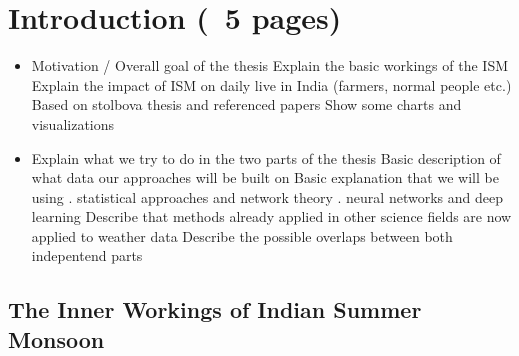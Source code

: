 \chapter{Introduction (~5 pages)}
\begin{itemize}
	\item Motivation / Overall goal of the thesis
	\subitem Explain the basic workings of the ISM
	\subitem Explain the impact of ISM on daily live in India (farmers, normal people etc.)
	\subitem Based on stolbova thesis and referenced papers
	\subitem Show some charts and visualizations
	\item Explain what we try to do in the two parts of the thesis
	\subitem Basic description of what data our approaches will be built on
	\subitem Basic explanation that we will be using
	. statistical approaches and network theory
	. neural networks and deep learning
	\subitem Describe that methods already applied in other science fields are now applied to weather data
	\subitem Describe the possible overlaps between both indepentend parts
\end{itemize}

\section{The Inner Workings of Indian Summer Monsoon}
